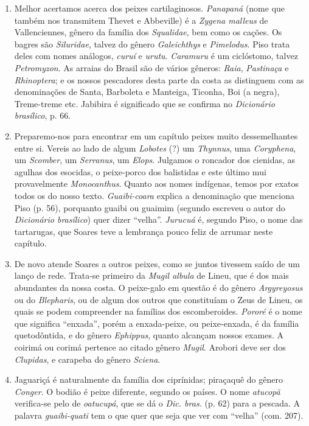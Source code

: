 \begin{enumerate}
\item  Melhor acertamos acerca dos peixes cartilaginosos. \textit{Panapaná}
(nome que também nos transmitem Thevet e Abbeville) é a \textit{Zygena malleus}
de Vallenciennes, gênero da família dos \textit{Squalidae}, bem como os cações. Os
bagres são \textit{Siluridae}, talvez do gênero \textit{Galeichthys} e \textit{Pimelodus}. Piso trata
deles com nomes análogos, \textit{curuí} e \textit{urutu}. \textit{Caramuru} é um ciclóstomo, talvez \textit{Petromyzon}. 
As arraias do Brasil são de vários gêneros: \textit{Raia}, \textit{Pastinaça} e
\textit{Rhinoptera}; e os nossos pescadores desta parte da costa as distinguem com
as denominações de Santa, Barboleta e Manteiga, Ticonha, Boi (a negra),
Treme-treme etc. Jabibira é significado que se confirma no \textit{Dicionário brasílico}, p. 66.

\item  Preparemo-nos para encontrar em um capítulo peixes muito 
dessemelhantes entre si. Vereis ao lado de algum \textit{Lobotes} (?) um \textit{Thynnus}, uma \textit{Coryphena}, 
um \textit{Scomber}, um \textit{Serranus}, um \textit{Elops}. Julgamos o roncador dos cienidas,
as agulhas dos esocidas, o peixe-porco dos balistidas e este último mui 
provavelmente \textit{Monocanthus}. Quanto aos nomes indígenas, temos por exatos todos
os do nosso texto. \textit{Guaibi-coara} explica a denominação que menciona
Piso (p. 56), porquanto guaibi ou guaimim (segundo escreveu o autor do
\textit{Dicionário brasílico}) quer dizer ``velha''.  \textit{Jurucuá} é, segundo Piso, o nome
das tartarugas, que Soares teve a lembrança pouco feliz de arrumar neste
capítulo.

\item  De novo atende Soares a outros peixes, como se juntos tivessem
saído de um lanço de rede. Trata-se primeiro da \textit{Mugil albula} de Lineu,
que é dos mais abundantes da nossa costa. O peixe-galo em questão é do gênero \textit{Argyreyosus} 
ou do \textit{Blepharis}, ou de algum dos 
outros que constituíam o Zeus de Lineu, os quais se podem compreender na famílias dos 
escomberoides. \textit{Pororé} é o nome que significa ``enxada'',  porém a enxada-peixe, ou peixe-enxada, é da família quetodôntida, 
e do gênero \textit{Ephippus}, quanto alcançam nossos exames. 
A coirimá ou corimá pertence ao citado gênero \textit{Mugil}. Arobori deve ser dos \textit{Clupidas}, e 
carapeba do gênero \textit{Sciena}.

\item  Jaguariçá é naturalmente da família dos ciprínidas; piraçaquê do
gênero \textit{Conger}. O bodião é peixe diferente, segundo os países. O nome
\textit{atucopã} verifica-se pelo de \textit{oatucupá}, que se dá o \textit{Dic. bras.} (p. 62) para
a pescada. A palavra \textit{guaibi-quati} tem o que quer que seja que ver com ``velha'' (com. 207).


\end{enumerate}
